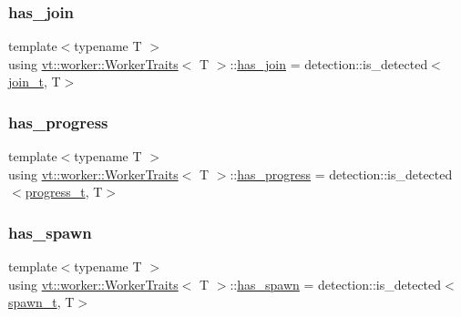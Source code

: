 \mbox{\label{structvt_1_1worker_1_1_worker_traits_a3e5bb1748dd46eb95c0507016e009ae0}} 
\subsubsection{\texorpdfstring{has\+\_\+join}{has\_join}}
{\footnotesize\ttfamily template$<$typename T $>$ \\
using \hyperlink{structvt_1_1worker_1_1_worker_traits}{vt\+::worker\+::\+Worker\+Traits}$<$ T $>$\+::\hyperlink{structvt_1_1worker_1_1_worker_traits_a3e5bb1748dd46eb95c0507016e009ae0}{has\+\_\+join} =  detection\+::is\+\_\+detected$<$\hyperlink{structvt_1_1worker_1_1_worker_traits_a69a3d1b3845fdac60940d2b3e6a6b240}{join\+\_\+t}, T$>$}

\mbox{\label{structvt_1_1worker_1_1_worker_traits_a431244d14714cc2bad0293ada8afb2e4}} 
\subsubsection{\texorpdfstring{has\+\_\+progress}{has\_progress}}
{\footnotesize\ttfamily template$<$typename T $>$ \\
using \hyperlink{structvt_1_1worker_1_1_worker_traits}{vt\+::worker\+::\+Worker\+Traits}$<$ T $>$\+::\hyperlink{structvt_1_1worker_1_1_worker_traits_a431244d14714cc2bad0293ada8afb2e4}{has\+\_\+progress} =  detection\+::is\+\_\+detected$<$\hyperlink{structvt_1_1worker_1_1_worker_traits_a0cda24a5c8ac86e6877aaa24b23034fd}{progress\+\_\+t}, T$>$}

\mbox{\label{structvt_1_1worker_1_1_worker_traits_abe1fbf0bbaefdbf7ad3fa761aca06bc6}} 
\subsubsection{\texorpdfstring{has\+\_\+spawn}{has\_spawn}}
{\footnotesize\ttfamily template$<$typename T $>$ \\
using \hyperlink{structvt_1_1worker_1_1_worker_traits}{vt\+::worker\+::\+Worker\+Traits}$<$ T $>$\+::\hyperlink{structvt_1_1worker_1_1_worker_traits_abe1fbf0bbaefdbf7ad3fa761aca06bc6}{has\+\_\+spawn} =  detection\+::is\+\_\+detected$<$\hyperlink{structvt_1_1worker_1_1_worker_traits_ab1c6768c82bad9bb5a911b5a676788a3}{spawn\+\_\+t}, T$>$}


